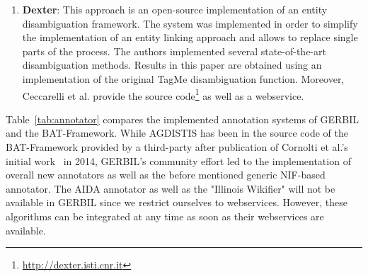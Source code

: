 \begin{enumerate}

\item \textbf{Dexter}: This approach \cite{ceccarelli2013dexter} is an open-source implementation of an entity disambiguation framework.
The system was implemented in order to simplify the implementation of an entity linking approach and allows to replace single parts of the process.
The authors implemented several state-of-the-art disambiguation methods.
Results in this paper are obtained using an implementation of the original TagMe disambiguation function.
Moreover, Ceccarelli et al. provide the source code\footnote{\url{http://dexter.isti.cnr.it}} as well as a webservice.
\end{enumerate}

Table~\ref{tab:annotator} compares the implemented annotation systems of GERBIL and the BAT-Framework.
While AGDISTIS has been in the source code of the BAT-Framework provided by a third-party after publication of Cornolti et al.'s initial work~\cite{cornolti} in 2014, GERBIL's community effort led to the implementation of overall \numberOfadditionalAnnotators new annotators as well as the before mentioned generic NIF-based annotator.
The AIDA annotator as well as the "Illinois Wikifier" will not be available in GERBIL since we restrict ourselves to webservices.
However, these algorithms can be integrated at any time as soon as their webservices are available.

